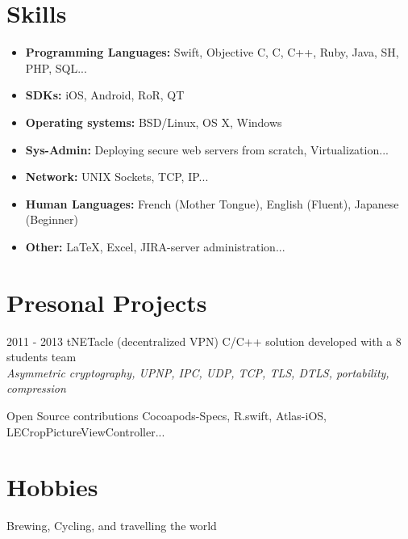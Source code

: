 \documentclass[]{template/friggeri-cv} %
\begin{document}

\section{Skills}

\begin{itemize}
\item \textbf{Programming Languages:} Swift, Objective C, C, C++, Ruby, Java, SH, PHP, SQL...
\item \textbf{SDKs:} iOS, Android, RoR, QT
\item \textbf{Operating systems:} BSD/Linux, OS X, Windows
\item \textbf{Sys-Admin:} Deploying secure web servers from scratch, Virtualization...
\item \textbf{Network:} UNIX Sockets, TCP, IP...
\item \textbf{Human Languages:} French (Mother Tongue), English (Fluent), Japanese (Beginner)
\item \textbf{Other:} \LaTeX, Excel, JIRA-server administration...
\end{itemize}


\section{Presonal Projects}
\begin{entrylist}
  \entry
      {2011 - 2013}
      {tNETacle (decentralized VPN)}
      {}
      {C/C++ solution developed with a 8 students team \\
      \emph{Asymmetric cryptography, UPNP, IPC, UDP, TCP, TLS, DTLS, portability, compression}}

\entry
{}
{Open Source contributions}
{}
{Cocoapods-Specs, R.swift, Atlas-iOS, LECropPictureViewController...}


\end{entrylist}


\section{Hobbies}

{Brewing, Cycling, and travelling the world}
\end{document}
